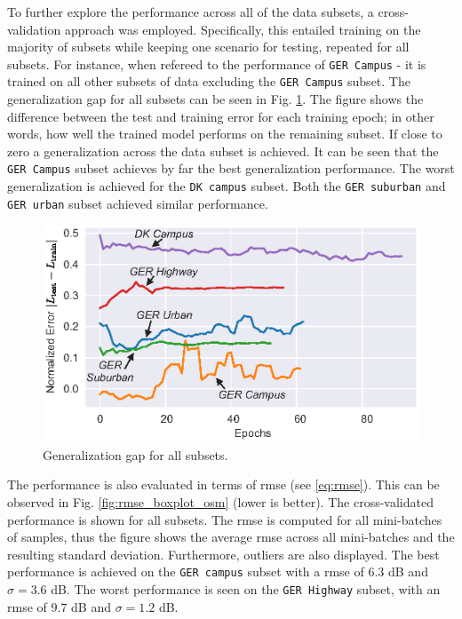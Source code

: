 To further explore the performance across all of the data subsets, a cross-validation approach was employed. Specifically, this entailed training on the majority of subsets while keeping one scenario for testing, repeated for all subsets. For instance, when refereed to the performance of \texttt{GER Campus} - it is trained on all other subsets of data excluding the \texttt{GER Campus} subset. The generalization gap for all subsets can be seen in Fig. \ref{fig:generalization_gap}. The figure shows the difference between the test and training error for each training epoch; in other words, how well the trained model performs on the remaining subset. If close to zero a generalization across the data subset is achieved. It can be seen that the \texttt{GER Campus} subset achieves by far the best generalization performance. The worst generalization is achieved for the \texttt{DK campus} subset. Both the \texttt{GER suburban} and \texttt{GER urban} subset achieved similar performance.

\begin{figure}[h]
    \centering
    \includegraphics{chapters/part_pathloss/osm_images_paper/figures/training_test_error_crossvalidation_diff.eps}
    \caption{Generalization gap for all subsets.}
    \label{fig:generalization_gap}
\end{figure}

The performance is also evaluated in terms of \gls{rmse} (see \ref{eq:rmse}). This can be observed in Fig. \ref{fig:rmse_boxplot_osm} (lower is better). The cross-validated performance is shown for all subsets. The \gls{rmse} is computed for all mini-batches of samples, thus the figure shows the average \gls{rmse} across all mini-batches and the resulting standard deviation. Furthermore, outliers are also displayed. The best performance is achieved on the \texttt{GER campus} subset with a \gls{rmse} of $6.3$ dB and $\sigma = 3.6$ dB. The worst performance is seen on the \texttt{GER Highway} subset, with an \gls{rmse} of $9.7$ dB and $\sigma = 1.2$ dB.


